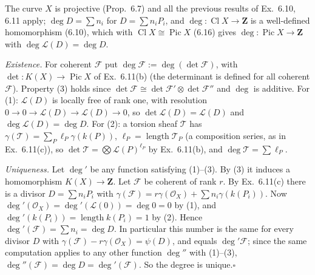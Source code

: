\documentclass[11pt]{article}
\begin{document}
\pf
The curve $X$ is projective (Prop.~6.7) and all the previous results of Ex.~6.10, 6.11 apply; $\deg D=\sum n_i$ for $D=\sum n_iP_i$, and $\deg:\operatorname{Cl}X\to\mathbf Z$ is a well-defined homomorphism (6.10), which with $\operatorname{Cl}X\cong\operatorname{Pic}X$ (6.16) gives $\deg:\operatorname{Pic}X\to\mathbf Z$ with $\deg\mathcal L(D)=\deg D$.

\emph{Existence.} For coherent $\mathcal F$ put $\deg\mathcal F:=\deg(\det\mathcal F)$, with $\det:K(X)\to\operatorname{Pic}X$ of Ex.~6.11(b) (the determinant is defined for all coherent $\mathcal F$). Property (3) holds since $\det\mathcal F\cong\det\mathcal F'\otimes\det\mathcal F''$ and $\deg$ is additive. For (1): $\mathcal L(D)$ is locally free of rank one, with resolution $0\to0\to\mathcal L(D)\to\mathcal L(D)\to0$, so $\det\mathcal L(D)=\mathcal L(D)$ and $\deg\mathcal L(D)=\deg D$. For (2): a torsion sheaf $\mathcal T$ has $\gamma(\mathcal T)=\sum_P\ell_P\gamma(k(P))$, $\ell_P=\operatorname{length}\mathcal T_P$ (a composition series, as in Ex.~6.11(c)), so $\det\mathcal T=\bigotimes\mathcal L(P)^{\ell_P}$ by Ex.~6.11(b), and $\deg\mathcal T=\sum\ell_P$.

\emph{Uniqueness.} Let $\deg'$ be any function satisfying (1)--(3). By (3) it induces a homomorphism $K(X)\to\mathbf Z$. Let $\mathcal F$ be coherent of rank $r$. By Ex.~6.11(c) there is a divisor $D=\sum n_iP_i$ with $\gamma(\mathcal F)=r\gamma(\mathcal O_X)+\sum n_i\gamma(k(P_i))$. Now $\deg'(\mathcal O_X)=\deg'(\mathcal L(0))=\deg0=0$ by (1), and $\deg'(k(P_i))=\operatorname{length}k(P_i)=1$ by (2). Hence $\deg'(\mathcal F)=\sum n_i=\deg D$. In particular this number is the same for every divisor $D$ with $\gamma(\mathcal F)-r\gamma(\mathcal O_X)=\psi(D)$, and equals $\deg'\mathcal F$; since the same computation applies to any other function $\deg''$ with (1)--(3), $\deg''(\mathcal F)=\deg D=\deg'(\mathcal F)$. So the degree is unique.\hfill$\square$
\end{document}
